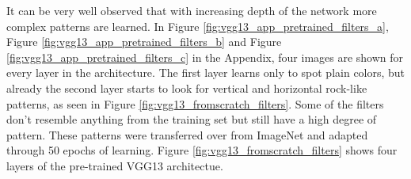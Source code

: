 \begin{figure}[H]
\label{fig:vgg13_pretrained_filters}
\end{figure}

It can be very well observed that with increasing depth of the network more complex patterns are learned. In Figure \ref{fig:vgg13_app_pretrained_filters_a}, Figure \ref{fig:vgg13_app_pretrained_filters_b} and Figure \ref{fig:vgg13_app_pretrained_filters_c} in the Appendix, four images are shown for every layer in the architecture. The first layer learns only to spot plain colors, but already the second layer starts to look for vertical and horizontal rock-like patterns, as seen in Figure \ref{fig:vgg13_fromscratch_filters}. Some of the filters don't resemble anything from the training set but still have a high degree of pattern. These patterns were transferred over from ImageNet and adapted through 50 epochs of learning. Figure \ref{fig:vgg13_fromscratch_filters} shows four layers of the pre-trained VGG13 architectue.

